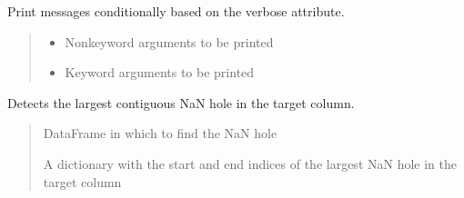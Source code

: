 \documentclass[letterpaper,10pt,english]{sphinxmanual}
\begin{document}
\begin{fulllineitems}
\begin{fulllineitems}
\label{\detokenize{docs/data_preprocessing:data_preprocessing.DataPreprocessor.conditional_print}}
\pysigstartsignatures
{}
\pysigstopsignatures
\sphinxAtStartPar
Print messages conditionally based on the verbose attribute.
\begin{quote}\begin{description}
\begin{itemize}
\item {} 
\sphinxAtStartPar
{} \textendash{} Non\sphinxhyphen{}keyword arguments to be printed

\item {} 
\sphinxAtStartPar
{} \textendash{} Keyword arguments to be printed

\end{itemize}

\end{description}\end{quote}

\end{fulllineitems}


\begin{fulllineitems}
\label{\detokenize{docs/data_preprocessing:data_preprocessing.DataPreprocessor.detect_nan_hole}}
\pysigstartsignatures
{}
\pysigstopsignatures
\sphinxAtStartPar
Detects the largest contiguous NaN hole in the target column.
\begin{quote}\begin{description}
\sphinxAtStartPar
{} \textendash{} DataFrame in which to find the NaN hole

\sphinxAtStartPar
A dictionary with the start and end indices of the largest NaN hole in the target column

\end{description}\end{quote}


\end{fulllineitems}
\end{fulllineitems}
\end{document}
